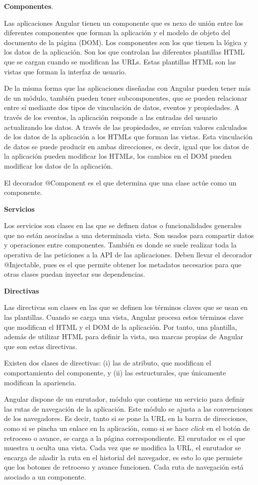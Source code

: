 \documentclass[a4paper, 12pt]{book}
\begin{document}
\textbf{Componentes}. 

Las aplicaciones Angular tienen un componente que es nexo de unión entre los diferentes componentes que forman la aplicación y el modelo de objeto del documento de la página (DOM). Los componentes son los que tienen la lógica y los datos de la aplicación. Son los que controlan las diferentes plantillas HTML que se cargan cuando se modifican las URLs. Estas plantillas HTML son las vistas que forman la interfaz de usuario.

De la misma forma que las aplicaciones diseñadas con Angular pueden tener más de un módulo, también pueden tener subcomponentes, que se pueden relacionar entre sí mediante dos tipos de vinculación de datos, eventos y propiedades. A través de los eventos, la aplicación responde a las entradas del usuario actualizando los datos. A través de las propiedades, se envían valores calculados de los datos de la aplicación a los HTMLs que forman las vistas. Esta vinculación de datos se puede producir en ambas direcciones, es decir, igual que los datos de la aplicación pueden modificar los HTMLs, los cambios en el DOM pueden modificar los datos de la aplicación.

El decorador @Component es el que determina que una clase actúe como un componente. 

\textbf{Servicios}

Los servicios son clases en las que se definen datos o funcionalidades generales que no están asociadas a una determinada vista. Son usados para compartir datos y operaciones entre componentes. También es donde se suele realizar toda la operativa de las peticiones a la API de las aplicaciones. Deben llevar el decorador @Injectable, pues es el que permite obtener los metadatos necesarios para que otras clases puedan inyectar sus dependencias. 

\textbf{Directivas}

Las directivas son clases en las que se definen los términos claves que se usan en las plantillas. Cuando se carga una vista, Angular procesa estos términos clave que modifican el HTML y el DOM de la aplicación. Por tanto, una plantilla, además de utilizar HTML para definir la vista, usa marcas propias de Angular que son estas directivas. 

Existen dos clases de directivas: (i) las de atributo, que modifican el comportamiento del componente, y (ii) las estructurales, que únicamente modifican la apariencia. 

Angular dispone de un enrutador, módulo que contiene un servicio para definir las rutas de navegación de la aplicación. Este módulo se ajusta a las convenciones de los navegadores. Es decir, tanto si se pone la URL en la barra de direcciones, como si se pincha un enlace en la aplicación, como si se hace \emph{click} en el botón de retroceso o avance, se carga a la página correspondiente. El enrutador es el que muestra u oculta una vista. Cada vez que se modifica la URL, el enrutador se encarga de añadir la ruta en el historial del navegador, es esto lo que permiete que los botones de retroceso y avance funcionen. Cada ruta de navegación está asociado a un componente. 
\end{document}
